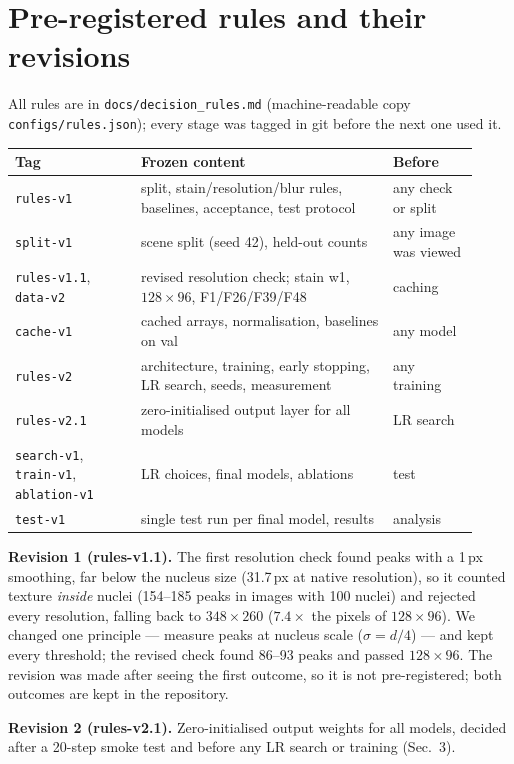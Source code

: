\documentclass[11pt,a4paper]{article}
\begin{document}
\section{Pre-registered rules and their revisions}
All rules are in \texttt{docs/decision\_rules.md} (machine-readable copy \texttt{configs/rules.json}); every
stage was tagged in git before the next one used it.
\begin{center}\footnotesize
\begin{tabular}{p{0.25\linewidth}p{0.5\linewidth}p{0.17\linewidth}}
\toprule
Tag & Frozen content & Before \\
\midrule
\texttt{rules-v1} & split, stain/resolution/blur rules, baselines, acceptance, test protocol & any check or split\\
\texttt{split-v1} & scene split (seed 42), held-out counts & any image was viewed\\
\texttt{rules-v1.1}, \texttt{data-v2} & revised resolution check; stain w1, $128\times96$, F1/F26/F39/F48 & caching\\
\texttt{cache-v1} & cached arrays, normalisation, baselines on val & any model\\
\texttt{rules-v2} & architecture, training, early stopping, LR search, seeds, measurement & any training\\
\texttt{rules-v2.1} & zero-initialised output layer for all models & LR search\\
\texttt{search-v1}, \texttt{train-v1}, \texttt{ablation-v1} & LR choices, final models, ablations & test\\
\texttt{test-v1} & single test run per final model, results & analysis\\
\bottomrule
\end{tabular}
\end{center}
\textbf{Revision 1 (rules-v1.1).} The first resolution check found peaks with a 1\,px smoothing, far below the
nucleus size (31.7\,px at native resolution), so it counted texture \emph{inside} nuclei (154--185 peaks in
images with 100 nuclei) and rejected every resolution, falling back to $348\times260$ ($7.4\times$ the pixels of
$128\times96$). We changed one principle --- measure peaks at nucleus scale ($\sigma=d/4$) --- and kept every
threshold; the revised check found 86--93 peaks and passed $128\times96$. The revision was made after seeing the
first outcome, so it is not pre-registered; both outcomes are kept in the repository.

\textbf{Revision 2 (rules-v2.1).} Zero-initialised output weights for all models, decided after a 20-step smoke
test and before any LR search or training (Sec.~3).
\end{document}
